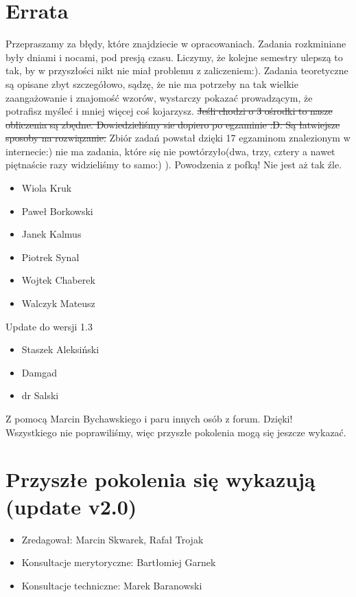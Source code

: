 \documentclass[a4paper, 10pt, ]{article}
\begin{document}
\section*{Errata}
Przepraszamy za błędy, które znajdziecie w opracowaniach. Zadania rozkminiane były dniami i nocami, pod presją czasu. Liczymy, że kolejne semestry ulepszą to tak, by w przyszłości nikt nie miał problemu z zaliczeniem:). Zadania teoretyczne są opisane zbyt szczegółowo, sądzę, że nie ma potrzeby na tak wielkie zaangażowanie i znajomość wzorów, wystarczy pokazać prowadzącym, że potrafisz myśleć i mniej więcej coś kojarzysz. \sout{Jeśli chodzi o 3 ośrodki to nasze obliczenia są zbędne. Dowiedzieliśmy sie dopiero po egzaminie :D. Są łatwiejsze sposoby na rozwiązanie.} Zbiór zadań powstał dzięki 17 egzaminom znalezionym w internecie:) nie ma zadania, które się nie powtórzyło(dwa, trzy, cztery a nawet piętnaście razy widzieliśmy to samo:) ). Powodzenia z pofką! Nie jest aż tak źle.
\begin{itemize}
\item Wiola Kruk
\item Paweł Borkowski
\item Janek Kalmus
\item Piotrek Synal
\item Wojtek Chaberek
\item Walczyk Mateusz
\end{itemize}
Update do wersji 1.3
\begin{itemize}
\item Staszek Aleksiński
\item Damgad
\item dr Salski
\end{itemize}
Z pomocą Marcin Bychawskiego i paru innych osób z forum. Dzięki!\\ Wszystkiego nie poprawiliśmy, więc przyszłe pokolenia mogą się jeszcze wykazać.\\

\section*{Przyszłe pokolenia się wykazują (update v2.0)}
\begin{itemize}
\item Zredagował: Marcin Skwarek, Rafał Trojak
\item Konsultacje merytoryczne: Bartłomiej Garnek
\item Konsultacje techniczne: Marek Baranowski
\end{itemize}
\end{document}
